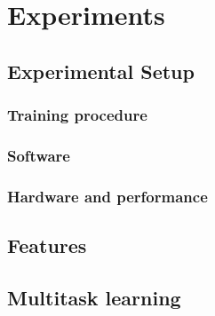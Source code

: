 \chapter{Experiments}%
\label{sec:experiments}


\section{Experimental Setup}%
\label{sec:experimental-setup}
\subsection{Training procedure}

\subsection{Software}

\subsection{Hardware and performance}


\section{Features}%
\label{sec:features}


\section{Multitask learning}\label{sec:multitask-experiments}

